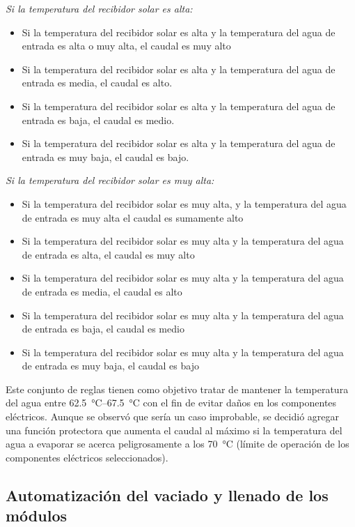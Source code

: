 			\textit{Si la temperatura del recibidor solar es alta:}\par
			\begin{itemize}
				\item Si la temperatura del recibidor solar es alta y la temperatura del agua de entrada es alta o muy alta, el caudal es muy alto
				\item Si la temperatura del recibidor solar es alta y la temperatura del agua de entrada es media, el caudal es alto.
				\item Si la temperatura del recibidor solar es alta y la temperatura del agua de entrada es baja, el caudal es medio.
				\item Si la temperatura del recibidor solar es alta y la temperatura del agua de entrada es muy baja, el caudal es bajo.
			\end{itemize}
			
			\textit{Si la temperatura del recibidor solar es muy alta:}\par
			\begin{itemize}
				\item Si la temperatura del recibidor solar es muy alta, y la temperatura del agua de entrada es muy alta el caudal es sumamente alto
				\item Si la temperatura del recibidor solar es muy alta y la temperatura del agua de entrada es alta, el caudal es muy alto
				\item Si la temperatura del recibidor solar es muy alta y la temperatura del agua de entrada es media, el caudal es alto
				\item Si la temperatura del recibidor solar es muy alta y la temperatura del agua de entrada es baja, el caudal es medio
				\item Si la temperatura del recibidor solar es muy alta y la temperatura del agua de entrada es muy baja, el caudal es bajo
			\end{itemize}
			
			Este conjunto de reglas tienen como objetivo tratar de mantener la temperatura del agua entre \qtyrange{62.5}{67.5}{\degreeCelsius} con el fin de evitar daños en los componentes eléctricos. Aunque se observó que sería un caso improbable, se decidió agregar una función protectora que aumenta el caudal al máximo si la temperatura del agua a evaporar se acerca peligrosamente a los \qty{70}{\degreeCelsius} (límite de operación de los componentes eléctricos seleccionados).
		
		\subsection{Automatización del vaciado y llenado de los módulos}
			

